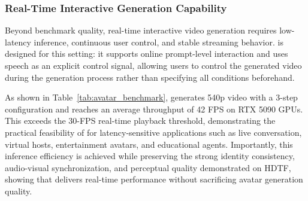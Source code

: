 \subsubsection{Real-Time Interactive Generation Capability}

Beyond benchmark quality, real-time interactive video generation requires low-latency inference, continuous user control, and stable streaming behavior. \ours is designed for this setting: it supports online prompt-level interaction and uses speech as an explicit control signal, allowing users to control the generated video during the generation process rather than specifying all conditions beforehand.

As shown in Table~\ref{tab:avatar_benchmark}, \ours generates 540p video with a 3-step configuration and reaches an average throughput of 42 FPS on RTX 5090 GPUs. This exceeds the 30-FPS real-time playback threshold, demonstrating the practical feasibility of \ours for latency-sensitive applications such as live conversation, virtual hosts, entertainment avatars, and educational agents. Importantly, this inference efficiency is achieved while preserving the strong identity consistency, audio-visual synchronization, and perceptual quality demonstrated on HDTF, showing that \ours delivers real-time performance without sacrificing avatar generation quality.